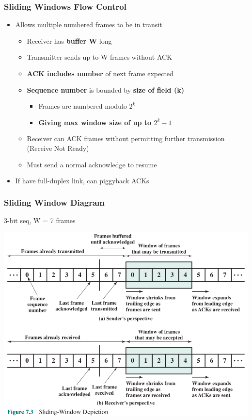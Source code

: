 \documentclass[pdflatex,compress]{beamer}
\begin{document}
\begin{frame}
	\frametitle{Sliding Windows Flow Control}
	\begin{itemize}
		\item Allows multiple numbered frames to be in transit
		\begin{itemize}
			\item Receiver has \textbf{buffer W} long
			\item Transmitter sends up to W frames without ACK
			\item \textbf{ACK includes number} of next frame expected
			\item \textbf{Sequence number} is bounded by \textbf{size of field (k)}
			\begin{itemize}
				\item Frames are numbered modulo $ 2^k $
				\item \textbf{Giving max window size of up to $ 2^k - 1 $}
			\end{itemize}
			\item Receiver can ACK frames without permitting further transmission (Receive Not Ready)
			\item Must send a normal acknowledge to resume
		\end{itemize}
		\item If have full-duplex link, can piggyback ACKs
	\end{itemize}
\end{frame}

\begin{frame}
	\frametitle{Sliding Window Diagram}
	\begin{flushright}
		3-bit seq, W = 7 frames
	\end{flushright}
	\begin{center}
		\includegraphics[width=0.8\linewidth]{img/img03}
	\end{center}
\end{frame}
\end{document}

